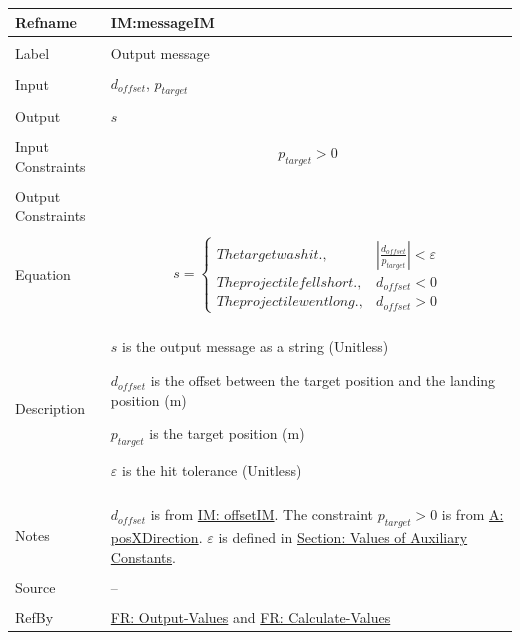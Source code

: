 \documentclass[12pt]{article}
\begin{document}
\noindent \begin{minipage}{\textwidth}
\begin{tabular}{p{} p{}}
\toprule \textbf{Refname} & \textbf{IM:messageIM}
\label{IM:messageIM}
\\ \midrule \\
Label & Output message
\\ \midrule \\
Input & ${d_{offset}}$, ${p_{target}}$
\\ \midrule \\
Output & $s$
\\ \midrule \\
Input Constraints & \begin{displaymath}
                    {p_{target}}>0
                    \end{displaymath}
\\ \midrule \\
Output Constraints & 
\\ \midrule \\
Equation & \begin{displaymath}
           s=\begin{cases}
The target was hit., & |\frac{{d_{offset}}}{{p_{target}}}|<ε\\
The projectile fell short., & {d_{offset}}<0\\
The projectile went long., & {d_{offset}}>0
\end{cases}
           \end{displaymath}
\\ \midrule \\
Description & \begin{symbDescription}
              \item{$s$ is the output message as a string (Unitless)}
              \item{${d_{offset}}$ is the offset between the target position and the landing position (m)}
              \item{${p_{target}}$ is the target position (m)}
              \item{$ε$ is the hit tolerance (Unitless)}
              \end{symbDescription}
\\ \midrule \\
Notes & ${d_{offset}}$ is from \hyperref[IM:offsetIM]{IM: offsetIM}.
        The constraint ${p_{target}}>0$ is from \hyperref[posXDirection]{A: posXDirection}.
        $ε$ is defined in \hyperref[Sec:AuxConstants]{Section: Values of Auxiliary Constants}.
\\ \midrule \\
Source & --
\\ \midrule \\
RefBy & \hyperref[outputValues]{FR: Output-Values} and \hyperref[calcValues]{FR: Calculate-Values}
\\ \bottomrule \end{tabular}
\end{minipage}
\end{document}
